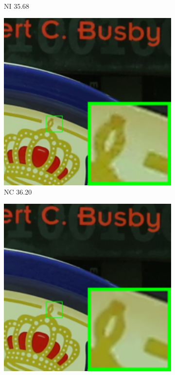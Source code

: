 \begin{figure}
\begin{subfigure}[t]{0.19\textwidth}
\caption{NI 35.68}
    \end{subfigure}
\hfill
    \begin{subfigure}[t]{0.19\textwidth}
        \centering
        \includegraphics[width=1\textwidth]{images/mcwnnm/cc/resize_br_NC_CC15_5dmark3_iso3200_1.png}
		\caption{NC 36.20}
    \end{subfigure}
    \hfill
    \begin{subfigure}[t]{0.19\textwidth}
        \centering
        \includegraphics[width=1\textwidth]{images/mcwnnm/cc/resize_br_CC_CC15_5dmark3_iso3200_1.png}

\end{subfigure}
\end{figure}
